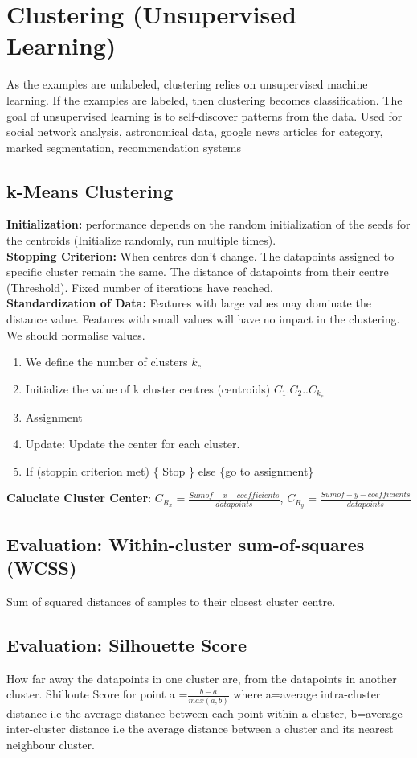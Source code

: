 \section{Clustering (Unsupervised Learning)}
As the examples are unlabeled, clustering relies on unsupervised machine learning. If the examples are labeled, then clustering becomes classification. The goal of unsupervised learning is to self-discover patterns from the data. Used for social network analysis, astronomical data, google news articles for category, marked segmentation, recommendation systems

\subsection{k-Means Clustering}
\textbf{Initialization:} performance depends on the random initialization of the seeds for the centroids (Initialize randomly, run multiple times).\\
\textbf{Stopping Criterion:}  When centres don’t change. The datapoints assigned to specific cluster remain the same. The distance of datapoints from their centre (Threshold). Fixed number of iterations have reached.\\
\textbf{Standardization of Data:} Features with large values may dominate the distance value. Features with small values will have no impact in the clustering. We should normalise values.

\begin{enumerate}[topsep=0pt]
	\itemsep -0.5em
  	\item We define the number of clusters $k_{c}$
  	\item Initialize the value of k cluster centres (centroids) $C_{1}. C_{2}..C_{k_{c}}$
  	\item Assignment
  	\item Update: Update the center for each cluster.
  	\item If (stoppin criterion met) \{ Stop \} else \{go to assignment\}
\end{enumerate}
\textbf{Caluclate Cluster Center}: $C_{R_x} = \frac{Sum of-x-coefficients}{data points}$, $C_{R_y} = \frac{Sum of-y-coefficients}{data points}$

\subsection{Evaluation: Within-cluster sum-of-squares (WCSS) }
Sum of squared distances of samples to their closest cluster centre.

\subsection{Evaluation: Silhouette Score} 
How far away the datapoints in one cluster are, from the datapoints in another cluster. Shilloute Score for point a  =$\frac{b-a}{max(a,b)}$ where a=average intra-cluster distance i.e the average distance between each point within a cluster, b=average inter-cluster distance i.e the average distance between a cluster and its nearest neighbour cluster.

